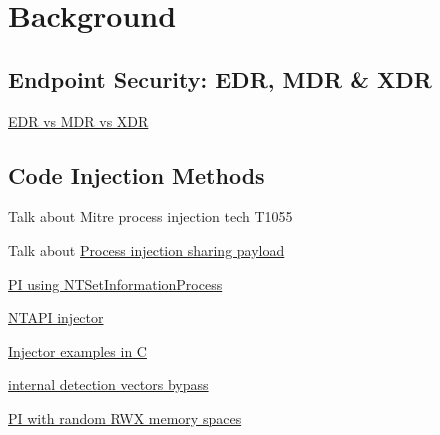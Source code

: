 \section{Background}

\subsection{Endpoint Security: EDR, MDR \& XDR}

\href{https://www.crowdstrike.com/cybersecurity-101/endpoint-security/edr-vs-mdr-vs-xdr/}{EDR vs MDR vs XDR}


\subsection{Code Injection Methods}

Talk about Mitre process injection tech T1055 \cite{Mitre:2017}

Talk about 
\href{https://modexp.wordpress.com/2018/07/15/process-injection-sharing-payload/}{Process injection sharing payload}

\href{https://www.riskinsight-wavestone.com/en/2023/10/process-injection-using-ntsetinformationprocess/}{PI using NTSetInformationProcess}

\href{https://github.com/elddy/Windows-NTAPI-Injector}{NTAPI injector} 

\href{https://gist.github.com/WKL-Sec/96e17188e4c159c2cdf7ff2c111130cc#file-local-c}{Injector examples in C}

\href{https://www.unknowncheats.me/forum/anti-cheat-bypass/286274-internal-detection-vectors-bypass.html}{internal detection vectors bypass}

\href{https://medium.com/@s12deff/process-injection-with-random-rwx-memory-spaces-3e3651149527}{PI with random RWX memory spaces}
